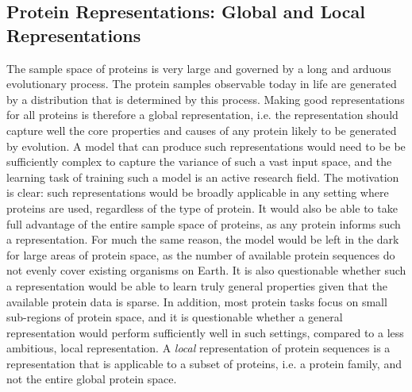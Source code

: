 
\subsection{Protein Representations: Global and Local Representations}
The sample space of proteins is very large and governed by a long and arduous evolutionary process. The protein samples observable today in life are generated by a distribution that is determined by this process. Making good representations for all proteins is therefore a global representation, i.e. the representation should capture well the core properties and causes of any protein likely to be generated by evolution. A model that can produce such representations would need to be be sufficiently complex to capture the variance of such a vast input space, and the learning task of training such a model is an active research field. The motivation is clear: such representations would be broadly applicable in any setting where proteins are used, regardless of the type of protein. It would also be able to take full advantage of the entire sample space of proteins, as any protein informs such a representation. For much the same reason, the model would be left in the dark for large areas of protein space, as the number of available protein sequences do not evenly cover existing organisms on Earth. It is also questionable whether such a representation would be able to learn truly general properties given that the available protein data is sparse. In addition, most protein tasks focus on small sub-regions of protein space, and it is questionable whether a general representation would perform sufficiently well in such settings, compared to a less ambitious, local representation. A \textit{local} representation of protein sequences is a representation that is applicable to a subset of proteins, i.e. a protein family, and not the entire global protein space.
